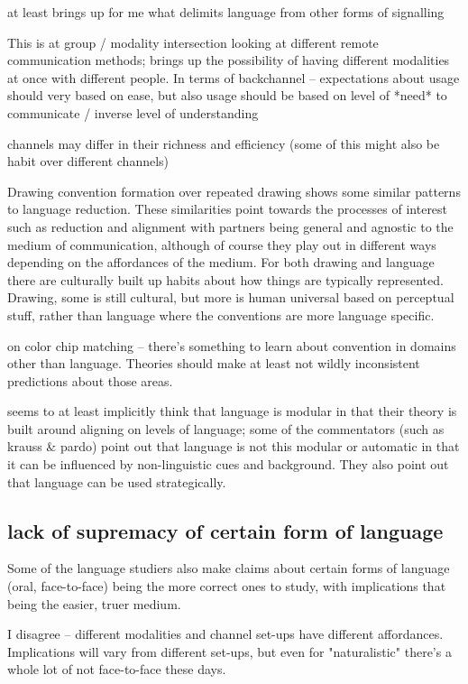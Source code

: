 \documentclass[]{article}
\begin{document}
\cite{clark1996} at least brings up for me what delimits language from other forms of signalling

This is at group / modality intersection \cite{foxtree2013} looking at different remote communication methods; brings up the possibility of having different modalities at once with different people. In terms of backchannel -- expectations about usage should very based on ease, but also usage should be based on level of *need* to communicate / inverse level of understanding 

channels may differ in their richness and efficiency (some of this might also be habit over different channels)

\cite{hawkinsa} Drawing convention formation over repeated drawing shows some similar patterns to language reduction. These similarities point towards the processes of interest such as reduction and alignment with partners being general and agnostic to the medium of communication, although of course they play out in different ways depending on the affordances of the medium. For both drawing and language there are culturally built up habits about how things are typically represented. Drawing, some is still cultural, but more is human universal based on perceptual stuff, rather than language where the conventions are more language specific. 

\cite{murthy2022} on color chip matching -- there's something to learn about convention in domains other than language. Theories should make at least not wildly inconsistent predictions about those areas. 

\cite{pickering2004} seems to at least implicitly think that language is modular in that their theory is built around aligning on levels of language; some of the commentators (such as krauss \& pardo) point out that language is not this modular or automatic in that it can be influenced by non-linguistic cues and background. They also point out that language can be used strategically. 

\subsection{lack of supremacy of certain form of language}
Some of the language studiers also make claims about certain forms of language (oral, face-to-face) being the more correct ones to study, with implications that being the easier, truer medium. 

I disagree -- different modalities and channel set-ups have different affordances. Implications will vary from different set-ups, but even for "naturalistic" there's a whole lot of not face-to-face these days. 
\end{document}
